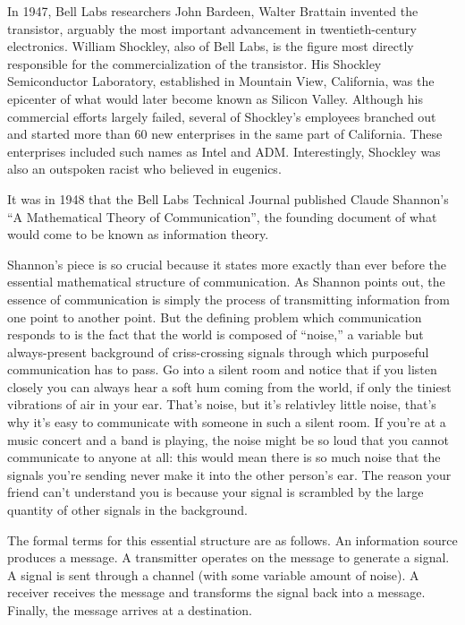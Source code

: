 \documentclass[12pt,book]{article}
\begin{document}
In 1947, Bell Labs researchers John Bardeen, Walter Brattain invented
the transistor, arguably the most important advancement in
twentieth-century electronics. William Shockley, also of Bell Labs, is
the figure most directly responsible for the commercialization of the
transistor. His Shockley Semiconductor Laboratory, established in
Mountain View, California, was the epicenter of what would later become
known as Silicon Valley. Although his commercial efforts largely failed,
several of Shockley's employees branched out and started more than 60
new enterprises in the same part of California. These enterprises
included such names as Intel and ADM. Interestingly, Shockley was also
an outspoken racist who believed in eugenics.

It was in 1948 that the Bell Labs Technical Journal published Claude
Shannon's ``A Mathematical Theory of Communication'', the founding
document of what would come to be known as information theory.

Shannon's piece is so crucial because it states more exactly than ever
before the essential mathematical structure of communication. As Shannon
points out, the essence of communication is simply the process of
transmitting information from one point to another point. But the
defining problem which communication responds to is the fact that the
world is composed of ``noise,'' a variable but always-present background
of criss-crossing signals through which purposeful communication has to
pass. Go into a silent room and notice that if you listen closely you
can always hear a soft hum coming from the world, if only the tiniest
vibrations of air in your ear. That's noise, but it's relativley little
noise, that's why it's easy to communicate with someone in such a silent
room. If you're at a music concert and a band is playing, the noise
might be so loud that you cannot communicate to anyone at all: this
would mean there is so much noise that the signals you're sending never
make it into the other person's ear. The reason your friend can't
understand you is because your signal is scrambled by the large quantity
of other signals in the background.

The formal terms for this essential structure are as follows. An
information source produces a message. A transmitter operates on the
message to generate a signal. A signal is sent through a channel (with
some variable amount of noise). A receiver receives the message and
transforms the signal back into a message. Finally, the message arrives
at a destination.
\end{document}

